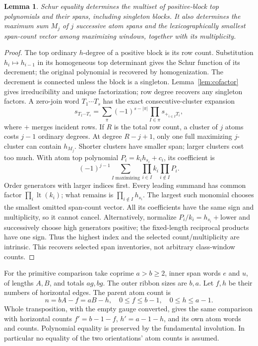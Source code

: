 \documentclass[11pt,a4paper]{amsart}
\numberwithin{equation}{section}
\theoremstyle{plain}
\newtheorem{lemma}[theorem]{Lemma}
\theoremstyle{definition}
\begin{document}
\begin{lemma}\label{lem:atom-inventory}
Schur equality determines the multiset of positive-block top polynomials and their spans, including singleton blocks.  It also determines the maximum sum \(M_j\) of \(j\) successive atom spans and the lexicographically smallest span-count vector among maximizing windows, together with its multiplicity.
\end{lemma}
\begin{proof}
The top ordinary \(h\)-degree of a positive block is its row count.  Substitution \(h_i\mapsto h_{i-1}\) in its homogeneous top determinant gives the Schur function of its decrement; the original polynomial is recovered by homogenization.  The decrement is connected unless the block is a singleton.  Lemma~\ref{lem:cofactor} gives irreducibility and unique factorization; row degree recovers any singleton factors.  A zero-join word \(T_1\cdots T_s\) has the exact consecutive-cluster expansion
\[
 s_{T_1\cdots T_s}=\sum_{\pi}(-1)^{s-|\pi|}\prod_{I\in\pi}s_{\mathop{+}_{i\in I}T_i},
\]
where \(+\) merges incident rows.  If \(R\) is the total row count, a cluster of \(j\) atoms costs \(j-1\) ordinary degrees.  At degree \(R-j+1\), only one full maximizing \(j\)-cluster can contain \(h_{M_j}\).  Shorter clusters have smaller span; larger clusters cost too much.  With atom top polynomial \(P_i=k_i h_{s_i}+c_i\), its coefficient is
\[
 (-1)^{j-1}\sum_{I\text{ maximizing}}\prod_{i\in I}k_i\prod_{i\notin I}P_i.
\]
Order generators with larger indices first.  Every leading summand has common factor \(\prod_i\operatorname{lt}(k_i)\); what remains is \(\prod_{i\notin I}h_{s_i}\).  The largest such monomial chooses the smallest omitted span-count vector.  All its coefficients have the same sign and multiplicity, so it cannot cancel.  Alternatively, normalize \(P_i/k_i=h_{s_i}+\text{lower}\) and successively choose high generators positive; the fixed-length reciprocal products have one sign.  Thus the highest index and the selected count/multiplicity are intrinsic.  This recovers selected span inventories, not arbitrary class-window counts.
\end{proof}

For the primitive comparison take coprime \(a>b\ge2\), inner span words \(e\) and \(u\), of lengths \(A,B\), and totals \(ag,bg\).  The outer ribbon sizes are \(b,a\).  Let \(f,h\) be their numbers of horizontal edges.  The parent atom count is
\[
 n=bA-f=aB-h,\quad 0\le f\le b-1,\quad0\le h\le a-1.
\]
Whole transposition, with the empty gauge converted, gives the same comparison with horizontal counts \(f'=b-1-f\), \(h'=a-1-h\), and its own atom words and counts.  Polynomial equality is preserved by the fundamental involution.  In particular no equality of the two orientations' atom counts is assumed.
\end{document}
